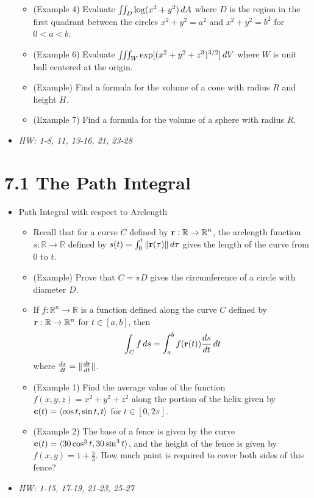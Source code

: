 \documentclass[11pt]{article}
\begin{document}
\begin{itemize}
\begin{itemize}
            \)
      \item (Example 4) Evaluate \(\iint_D\log(x^2+y^2)\,d A\) where \(D\)
            is the region in the first quadrant between the circles
            \(x^2+y^2=a^2\) and \(x^2+y^2=b^2\) for \(0<a<b\).
      \item (Example 6) Evaluate \(\iiint_W\exp[(x^2+y^2+z^3)^{3/2}]\,d V\)
            where \(W\) is unit ball centered at the origin.
      \item (Example) Find a formula for the volume of a cone with radius
            \(R\) and height \(H\).
      \item (Example 7) Find a formula for the volume of a sphere with
            radius \(R\).
    \end{itemize}
  \item\textit{
    HW: 1-8, 11, 13-16, 21, 23-28
  }
\end{itemize}



\section*{7.1 The Path Integral}

\begin{itemize}
  \item Path Integral with respect to Arclength
    \begin{itemize}
      \item Recall that for a curve \(C\) defined by
            \(\mathbf{r}:\mathbb R\to\mathbb R^n\), the arclength function
            \(s:\mathbb R\to\mathbb R\) defined by
            \(s(t)=\int_0^t\|\mathbf{r}(\tau)\|\,d\tau\) gives the length
            of the curve from \(0\) to \(t\).
      \item (Example) Prove that \(C=\pi D\) gives the circumference of
            a circle with diameter \(D\).
      \item If \(f:\mathbb R^n\to\mathbb R\) is a function defined
            along the curve \(C\) defined by \(\mathbf{r}:\mathbb R\to\mathbb R^n\)
            for \(t\in[a,b]\), then
            \[
              \int_C f\,d s
                =
              \int_a^b f(\mathbf{r}(t))\frac{ds}{dt}\,d t
            \]
            where \(\frac{ds}{dt}=\|\frac{d\mathbf{r}}{dt}\|\).
      \item (Example 1) Find the average value of the function
            \(f(x,y,z)=x^2+y^2+z^2\) along the portion of the helix given by
            \(\mathbf{c}(t)=\langle\cos t,\sin t,t\rangle\) for \(t\in[0,2\pi]\).
      \item (Example 2) The base of a fence is given by the curve
            \(\mathbf{c}(t)=\langle30\cos^3t,30\sin^3t\rangle\), and the height of the
            fence is given by \(f(x,y)=1+\frac{y}{3}\). How much paint is
            required to cover both sides of this fence?
    \end{itemize}
  \item\textit{
    HW: 1-15, 17-19, 21-23, 25-27
  }
\end{itemize}
\end{document}
